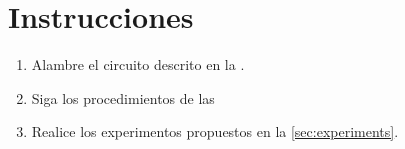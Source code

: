 %
%


\section{Instrucciones}%
\label{sec:instructions}
\begin{enumerate}[noitemsep]
	\item Alambre el circuito descrito en la .
	\item Siga los procedimientos de las 
 	\item Realice los experimentos propuestos en la \cref{sec:experiments}.
\end{enumerate}




% 
